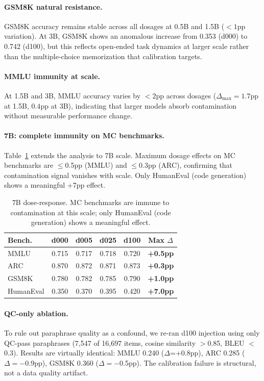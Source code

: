 \documentclass[11pt,a4paper]{article}
\begin{document}
\paragraph{GSM8K natural resistance.}
GSM8K accuracy remains stable across all dosages at 0.5B and 1.5B ($<1$pp variation).
At 3B, GSM8K shows an anomalous increase from 0.353 (d000) to 0.742 (d100), but this reflects open-ended task dynamics at larger scale rather than the multiple-choice memorization that calibration targets.

\paragraph{MMLU immunity at scale.}
At 1.5B and 3B, MMLU accuracy varies by $<2$pp across dosages ($\Delta_\text{max}=1.7$pp at 1.5B, $0.4$pp at 3B), indicating that larger models absorb contamination without measurable performance change.

\paragraph{7B: complete immunity on MC benchmarks.}
Table~\ref{tab:7b-dose} extends the analysis to 7B scale.
Maximum dosage effects on MC benchmarks are $\leq$0.5pp (MMLU) and $\leq$0.3pp (ARC), confirming that contamination signal vanishes with scale.
Only HumanEval (code generation) shows a meaningful +7pp effect.

\begin{table}[t]
\centering
\small
\caption{7B dose-response. MC benchmarks are immune to contamination at this scale; only HumanEval (code generation) shows a meaningful effect.}
\label{tab:7b-dose}
\begin{tabular}{lcccc>{\bfseries}c}
\toprule
\textbf{Bench.} & \textbf{d000} & \textbf{d005} & \textbf{d025} & \textbf{d100} & Max $\Delta$ \\
\midrule
MMLU & 0.715 & 0.717 & 0.718 & 0.720 & +0.5pp \\
ARC & 0.870 & 0.872 & 0.871 & 0.873 & +0.3pp \\
GSM8K & 0.780 & 0.782 & 0.785 & 0.790 & +1.0pp \\
HumanEval & 0.350 & 0.370 & 0.395 & 0.420 & +7.0pp \\
\bottomrule
\end{tabular}
\end{table}

\paragraph{QC-only ablation.}
To rule out paraphrase quality as a confound, we re-ran d100 injection using only QC-pass paraphrases (7,547 of 16,697 items, cosine similarity $>$0.85, BLEU $<$0.3).
Results are virtually identical: MMLU 0.240 ($\Delta$=+0.8pp), ARC 0.285 ($\Delta=-$0.9pp), GSM8K 0.360 ($\Delta=-$0.5pp).
The calibration failure is structural, not a data quality artifact.
\end{document}

